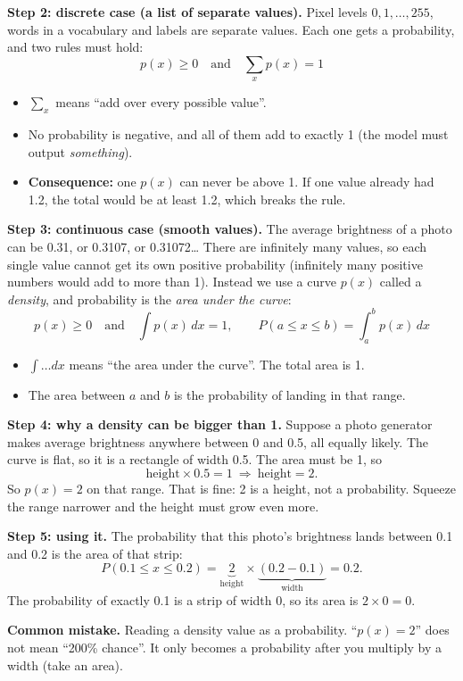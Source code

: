 \documentclass[12pt,a4paper]{article}
\begin{document}
\textbf{Step 2: discrete case (a list of separate values).} Pixel levels $0,1,\dots,255$, words in a vocabulary and labels are separate values. Each one gets a probability, and two rules must hold:
\[
p(x)\ge 0\quad\text{and}\quad \sum_x p(x)=1
\]
\begin{itemize}[nosep]
  \item $\sum_x$ means ``add over every possible value''.
  \item No probability is negative, and all of them add to exactly 1 (the model must output \emph{something}).
  \item \textbf{Consequence:} one $p(x)$ can never be above 1. If one value already had 1.2, the total would be at least 1.2, which breaks the rule.
\end{itemize}

\textbf{Step 3: continuous case (smooth values).} The average brightness of a photo can be 0.31, or 0.3107, or 0.31072\dots{} There are infinitely many values, so each single value cannot get its own positive probability (infinitely many positive numbers would add to more than 1). Instead we use a curve $p(x)$ called a \emph{density}, and probability is the \emph{area under the curve}:
\[
p(x)\ge 0\quad\text{and}\quad \int p(x)\,dx=1,\qquad P(a\le x\le b)=\int_a^b p(x)\,dx
\]
\begin{itemize}[nosep]
  \item $\int\dots dx$ means ``the area under the curve''. The total area is 1.
  \item The area between $a$ and $b$ is the probability of landing in that range.
\end{itemize}

\textbf{Step 4: why a density can be bigger than 1.} Suppose a photo generator makes average brightness anywhere between 0 and 0.5, all equally likely. The curve is flat, so it is a rectangle of width 0.5. The area must be 1, so
\[
\text{height}\times0.5=1\ \Rightarrow\ \text{height}=2 .
\]
So $p(x)=2$ on that range. That is fine: 2 is a height, not a probability. Squeeze the range narrower and the height must grow even more.

\textbf{Step 5: using it.} The probability that this photo's brightness lands between 0.1 and 0.2 is the area of that strip:
\[
P(0.1\le x\le 0.2)=\underbrace{2}_{\text{height}}\times\underbrace{(0.2-0.1)}_{\text{width}}=0.2 .
\]
The probability of exactly 0.1 is a strip of width 0, so its area is $2\times0=0$.

\textbf{Common mistake.} Reading a density value as a probability. ``$p(x)=2$'' does not mean ``200\% chance''. It only becomes a probability after you multiply by a width (take an area).
\end{document}
